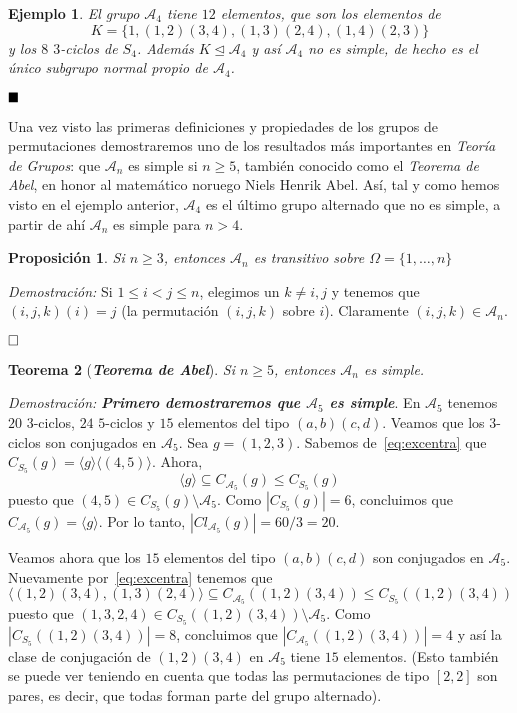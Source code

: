 \documentclass[12pt]{article}
\newtheorem{theorem}{Teorema}[section]
\newtheorem{proposition}[theorem]{Proposición}
\newtheorem{example}{Ejemplo}[theorem]
\begin{document}
\begin{example} El grupo $\mathcal{A}_{4}$ tiene $12$ elementos, que son los elementos de $$K = \lbrace 1,(1,2)(3,4),(1,3)(2,4),(1,4)(2,3) \rbrace$$ y los $8$ $3$-ciclos de $S_{4}$. Además $K \unlhd \mathcal{A}_{4}$ y así $\mathcal{A}_{4}$ no es simple, de hecho es el único subgrupo normal propio de $\mathcal{A}_{4}$.
\end{example}

$\hfill \blacksquare$

Una vez visto las primeras definiciones y propiedades de los grupos de permutaciones demostraremos uno de los resultados más importantes en \textit{Teoría de Grupos}: que $\mathcal{A}_{n}$ es simple si $n \geq 5$, también conocido como el \textit{Teorema de Abel}, en honor al matemático noruego Niels Henrik Abel. Así, tal y como hemos visto en el ejemplo anterior, $\mathcal{A}_4$ es el último grupo alternado que no es simple, a partir de ahí $\mathcal{A}_n$ es simple para $n>4$.

\begin{proposition}\label{eq:preabel} Si $n \geq 3$, entonces $\mathcal{A}_{n}$ es transitivo sobre $\Omega =\lbrace 1, \ldots, n \rbrace$
\end{proposition}
\emph{Demostración: } Si $1 \leq i <j \leq n$, elegimos un $k \neq i,j$ y tenemos que $(i,j,k)(i) = j$ (la permutación $(i,j,k)$ sobre $i$). Claramente $(i,j,k) \in \mathcal{A}_{n}$.

$\hfill \square$

\begin{theorem}[\textbf{\textit{Teorema de Abel}}] Si $n \geq 5$, entonces $\mathcal{A}_{n}$ es simple.
\end{theorem}
\emph{Demostración: }\textbf{\textit{Primero demostraremos que $\mathcal{A}_{5}$ es simple}}. En $\mathcal{A}_{5}$ tenemos $20$ $3$-ciclos, $24$ $5$-ciclos y $15$ elementos del tipo $(a,b)(c,d)$. Veamos que los $3$-ciclos son conjugados en $\mathcal{A}_{5}$. Sea $g = (1,2,3)$. Sabemos de~\ref{eq:excentra} que $C_{S_{5}}(g)= \langle g\rangle \langle(4,5) \rangle$. Ahora, $$\langle g \rangle \subseteq C_{\mathcal{A}_{5}}(g) \leq C_{S_{5}}(g)$$ puesto que $(4,5) \in C_{S_{5}}(g) \setminus \mathcal{A}_{5}$. Como $|C_{S_{5}}(g)| = 6$, concluimos que $C_{\mathcal{A}_{5}}(g) = \langle g \rangle$. Por lo tanto, $|Cl_{\mathcal{A}_{5}}(g)| = 60/3 = 20.$ 

Veamos ahora que los $15$ elementos del tipo $(a,b)(c,d)$ son conjugados en $\mathcal{A}_{5}$. Nuevamente por~\ref{eq:excentra} tenemos que $$\langle (1,2)(3,4),(1,3)(2,4) \rangle \subseteq C_{\mathcal{A}_{5}}((1,2)(3,4)) \leq C_{S_{5}}((1,2)(3,4))$$ puesto que $(1,3,2,4) \in C_{S_{5}}((1,2)(3,4)) \setminus \mathcal{A}_{5}$. Como $|C_{S_{5}}((1,2)(3,4))| = 8$, concluimos que $|C_{\mathcal{A}_{5}}((1,2)(3,4))| = 4$ y así la clase de conjugación de $(1,2)(3,4)$ en $\mathcal{A}_{5}$ tiene $15$ elementos. (Esto también se puede ver teniendo en cuenta que todas las permutaciones de tipo $[2,2]$ son pares, es decir, que todas forman parte del grupo alternado).
\end{document}
